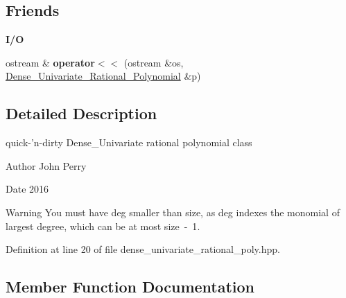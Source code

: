 \subsection*{Friends}
\begin{Indent}\textbf{ I/O}\par
\begin{DoxyCompactItemize}
\item 
\mbox{\label{class_dense___univariate___rational___polynomial_a070aa3f629127672cb47c9eec3ec102b}} 
ostream \& {\bfseries operator$<$$<$} (ostream \&os, \hyperlink{class_dense___univariate___rational___polynomial}{Dense\+\_\+\+Univariate\+\_\+\+Rational\+\_\+\+Polynomial} \&p)
\end{DoxyCompactItemize}
\end{Indent}


\subsection{Detailed Description}
quick-\/'n-\/dirty Dense\+\_\+\+Univariate rational polynomial class 

\begin{DoxyAuthor}{Author}
John Perry 
\end{DoxyAuthor}
\begin{DoxyDate}{Date}
2016 
\end{DoxyDate}
\begin{DoxyWarning}{Warning}
You must have {\ttfamily deg} smaller than {\ttfamily size}, as {\ttfamily deg} indexes the monomial of largest degree, which can be at most {\ttfamily size~-\/~1}. 
\end{DoxyWarning}


Definition at line 20 of file dense\+\_\+univariate\+\_\+rational\+\_\+poly.\+hpp.



\subsection{Member Function Documentation}
\mbox{\label{class_dense___univariate___rational___polynomial_a57f7bbe1cd7ae1c2ca66d12f988a9c6d}} 
